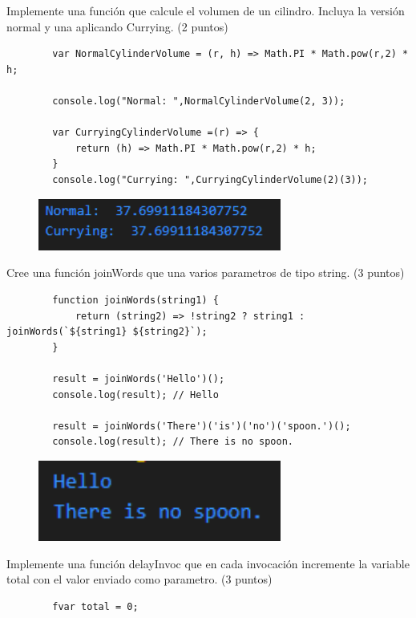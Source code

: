 \documentclass[12pt, a4paper]{exam}
\begin{document}
\begin{questions}
\pointsdroppedatright
	\question Implemente una función que calcule el volumen de un cilindro. Incluya la versión normal y una aplicando Currying. (2 puntos)
	\begin{verbatim}
		var NormalCylinderVolume = (r, h) => Math.PI * Math.pow(r,2) * h;

		console.log("Normal: ",NormalCylinderVolume(2, 3));

		var CurryingCylinderVolume =(r) => {
			return (h) => Math.PI * Math.pow(r,2) * h;
		}
		console.log("Currying: ",CurryingCylinderVolume(2)(3));
	\end{verbatim}

	\begin{figure}[h]
		\includegraphics[width=8cm]{3.png}
	\end{figure}
\vspace{0.2in}

\pointsdroppedatright
	\question Cree una función joinWords que una varios parametros de tipo string. (3 puntos)
	\begin{verbatim}
		function joinWords(string1) {
			return (string2) => !string2 ? string1 : joinWords(`${string1} ${string2}`);
		}

		result = joinWords('Hello')();
		console.log(result); // Hello

		result = joinWords('There')('is')('no')('spoon.')();
		console.log(result); // There is no spoon.
	\end{verbatim}

	\begin{figure}[h]
		\includegraphics[width=8cm]{4.png}
	\end{figure}
\vspace{0.2in}

\pointsdroppedatright
	\question Implemente una función delayInvoc que en cada invocación incremente la variable total con el valor enviado como parametro. (3 puntos)
	\begin{verbatim}
		fvar total = 0;


\end{verbatim}
\end{questions}
\end{document}

